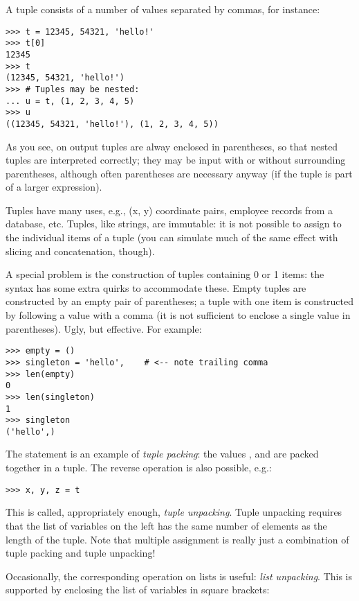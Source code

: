 \documentclass{manual}
\begin{document}
A tuple consists of a number of values separated by commas, for
instance:

\begin{verbatim}
>>> t = 12345, 54321, 'hello!'
>>> t[0]
12345
>>> t
(12345, 54321, 'hello!')
>>> # Tuples may be nested:
... u = t, (1, 2, 3, 4, 5)
>>> u
((12345, 54321, 'hello!'), (1, 2, 3, 4, 5))
\end{verbatim}

As you see, on output tuples are alway enclosed in parentheses, so
that nested tuples are interpreted correctly; they may be input with
or without surrounding parentheses, although often parentheses are
necessary anyway (if the tuple is part of a larger expression).

Tuples have many uses, e.g., (x, y) coordinate pairs, employee records
from a database, etc.  Tuples, like strings, are immutable: it is not
possible to assign to the individual items of a tuple (you can
simulate much of the same effect with slicing and concatenation,
though).

A special problem is the construction of tuples containing 0 or 1
items: the syntax has some extra quirks to accommodate these.  Empty
tuples are constructed by an empty pair of parentheses; a tuple with
one item is constructed by following a value with a comma
(it is not sufficient to enclose a single value in parentheses).
Ugly, but effective.  For example:

\begin{verbatim}
>>> empty = ()
>>> singleton = 'hello',    # <-- note trailing comma
>>> len(empty)
0
>>> len(singleton)
1
>>> singleton
('hello',)
\end{verbatim}

The statement  is an example of
\emph{tuple packing}: the values ,  and
 are packed together in a tuple.  The reverse operation
is also possible, e.g.:

\begin{verbatim}
>>> x, y, z = t
\end{verbatim}

This is called, appropriately enough, \emph{tuple unpacking}.  Tuple
unpacking requires that the list of variables on the left has the same
number of elements as the length of the tuple.  Note that multiple
assignment is really just a combination of tuple packing and tuple
unpacking!

Occasionally, the corresponding operation on lists is useful: \emph{list
unpacking}.  This is supported by enclosing the list of variables in
square brackets:
\end{document}
